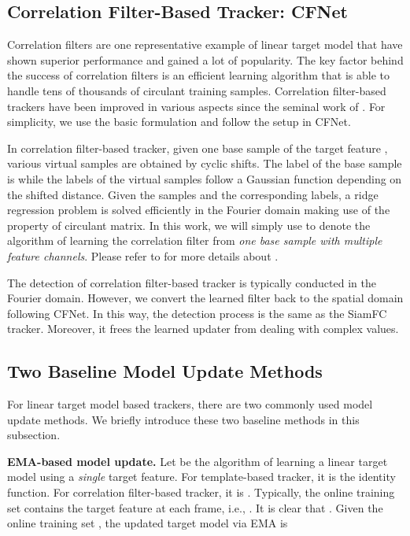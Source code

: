 \documentclass[journal]{IEEEtran}
\begin{document}
\subsection{Correlation Filter-Based Tracker: CFNet}
Correlation filters are one representative example of linear target model that have shown superior performance and gained a lot of popularity. The key factor behind the success of correlation filters is an efficient learning algorithm that is able to handle tens of thousands of circulant training samples. Correlation filter-based trackers have been improved in various aspects since the seminal work of \cite{bolme2010visual}. For simplicity, we use the basic formulation and follow the setup in CFNet\cite{valmadre2017end}.

In correlation filter-based tracker, given one base sample of the target feature , various virtual samples are obtained by cyclic shifts. The label of the base sample is  while the labels of the virtual samples follow a Gaussian function depending on the shifted distance. Given the samples and the corresponding labels, a ridge regression problem is solved efficiently in the Fourier domain making use of the property of circulant matrix\cite{gray2006toeplitz}. In this work, we will simply use  to denote the algorithm of learning the correlation filter from \emph{one base sample with multiple feature channels}. Please refer to \cite{bolme2010visual, henriques2015high} for more details about .

The detection of correlation filter-based tracker is typically conducted in the Fourier domain. However, we convert the learned filter back to the spatial domain following CFNet. In this way, the detection process is the same as the SiamFC tracker. Moreover, it frees the learned updater from dealing with complex values.

\subsection{Two Baseline Model Update Methods}
For linear target model based trackers, there are two commonly used model update methods. We briefly introduce these two baseline methods in this subsection.  

\textbf{EMA-based model update.} Let  be the algorithm of learning a linear target model using a \emph{single} target feature. For template-based tracker, it is the identity function. For correlation filter-based tracker, it is . Typically, the online training set contains the target feature at each frame, i.e., . It is clear that . Given the online training set , the updated target model via EMA is 
\end{document}
